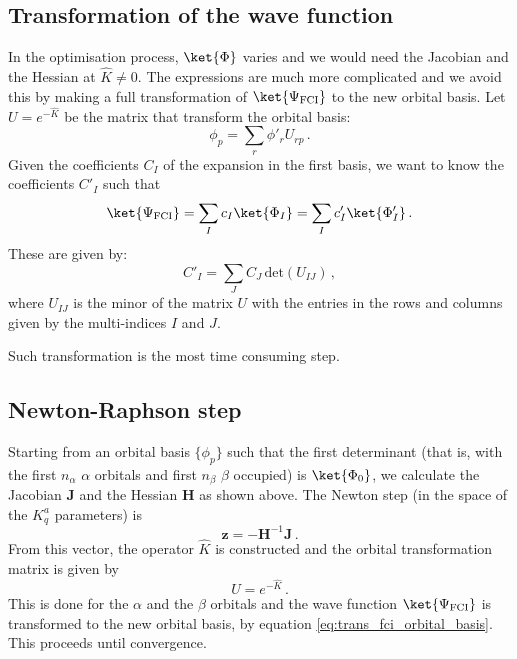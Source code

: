 \documentclass[a4paper,11pt]{article}
\begin{document}
\subsection{Transformation of the wave function}
In the optimisation process, $\ket{\Phi}$ varies and we would need the Jacobian and the Hessian at $\hat{K} \ne 0$.
The expressions are much more complicated and we avoid this by making a full transformation of $\ket{\Psi_\text{FCI}}$ to the new orbital basis.
Let $U = e^{-\hat{K}}$ be the matrix that transform the orbital basis:
\begin{equation}
  \phi_p = \sum_r \phi'_r U_{rp}\,.
\end{equation}
Given the coefficients $C_I$ of the expansion in the first basis, we want to know the coefficients $C'_I$ such that
\begin{equation}
  \ket{\Psi_\text{FCI}} = \sum_I c_I \ket{\Phi_I} = \sum_I c'_I \ket{\Phi'_I}\,.
\end{equation}
These are given by:
\begin{equation}\label{eq:trans_fci_orbital_basis}
  C'_I = \sum_J C_J\, \text{det}(U_{IJ})\,,
\end{equation}
where $U_{IJ}$ is the minor of the matrix $U$ with the entries in the rows and columns given by the multi-indices $I$ and $J$.

Such transformation is the most time consuming step.


\subsection{Newton-Raphson step}
Starting from an orbital basis $\{\phi_p\}$ such that the first determinant (that is, with the first $n_\alpha$ $\alpha$ orbitals and first $n_\beta$ $\beta$ occupied) is $\ket{\Phi_0}$, we calculate the Jacobian $\mathbf{J}$ and the Hessian $\mathbf{H}$ as shown above.
The Newton step (in the space of the $K_q^a$ parameters) is
\begin{equation}
  \mathbf{z} = -\mathbf{H}^{-1} \mathbf{J}\,.
\end{equation}
From this vector, the operator $\hat{K}$ is constructed and the orbital transformation matrix is given by
\begin{equation}
  U = e^{-\hat{K}}\,.
\end{equation}
This is done for the $\alpha$ and the $\beta$ orbitals and the wave function $\ket{\Psi_\text{FCI}}$ is transformed to the new orbital basis, by equation \eqref{eq:trans_fci_orbital_basis}.
This proceeds until convergence.
\end{document}
